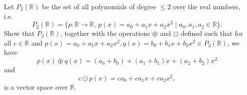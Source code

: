 \begin{exmp}
Let $ P_2(\mathbb{R}) $ be the set of all polynomials of degree $ \leq 2 $ over the real numbers, i.e.
\begin{equation*}
    P_2(\mathbb{R})=\{p:\mathbb{R}\to\mathbb{R},\,p(x)=a_0+a_1x+a_2x^2\mid a_0,a_1,a_2\in\mathbb{R}\}.
\end{equation*}
Show that $ P_2(\mathbb{R}) $, together with the operations $ \oplus $ and $ \odot $ defined such that for all $ c\in\mathbb{R} $ and $ p(x)=a_0+a_1x+a_2x^2,q(x)=b_0+b_1x+b_2x^2\in P_2(\mathbb{R}) $, we have
\begin{equation*}
    p(x)\oplus q(x)=(a_0+b_0)+(a_1+b_1)x+(a_2+b_2)x^2
\end{equation*}
and
\begin{equation*}
    c\odot p(x)=ca_0+ca_1x+ca_2x^2,
\end{equation*}
is a vector space over $ \mathbb{R} $.
\end{exmp}
